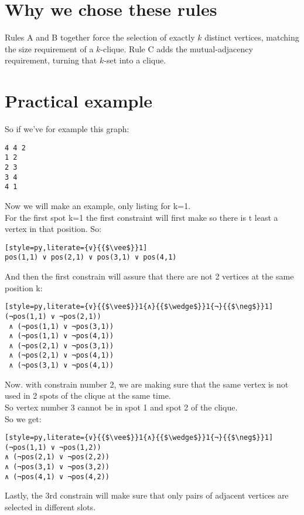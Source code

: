 \documentclass[11pt]{article}
\begin{document}
\section*{Why we chose these rules}
Rules A and B together force the selection of exactly $k$ distinct vertices, matching the size requirement of a $k$-clique.  
Rule C adds the mutual-adjacency requirement, turning that $k$-set into a clique.

\section*{Practical example}

So if we've for example this graph:

\begin{lstlisting}[style=py]
4 4 2
1 2
2 3
3 4
4 1
\end{lstlisting}

Now we will make an example, only listing for k=1. \\
For the first spot k=1 the first constraint will first make so there is t least a vertex in that position.
So:
\begin{lstlisting}[style=py,literate={∨}{{$\vee$}}1]
pos(1,1) ∨ pos(2,1) ∨ pos(3,1) ∨ pos(4,1)
\end{lstlisting}

And then the first constrain will assure that there are not 2 vertices at the same position k:

\begin{lstlisting}[style=py,literate={∨}{{$\vee$}}1{∧}{{$\wedge$}}1{¬}{{$\neg$}}1]
(¬pos(1,1) ∨ ¬pos(2,1))
 ∧ (¬pos(1,1) ∨ ¬pos(3,1))
 ∧ (¬pos(1,1) ∨ ¬pos(4,1))
 ∧ (¬pos(2,1) ∨ ¬pos(3,1))
 ∧ (¬pos(2,1) ∨ ¬pos(4,1))
 ∧ (¬pos(3,1) ∨ ¬pos(4,1))
 \end{lstlisting}


 Now. with constrain number 2, we are making sure that the same vertex is not used in 2 spots of the clique at the same time.\\
 So vertex number 3 cannot be in spot 1 and spot 2 of the clique.\\
 So we get:
 \begin{lstlisting}[style=py,literate={∨}{{$\vee$}}1{∧}{{$\wedge$}}1{¬}{{$\neg$}}1]
(¬pos(1,1) ∨ ¬pos(1,2))
∧ (¬pos(2,1) ∨ ¬pos(2,2))
∧ (¬pos(3,1) ∨ ¬pos(3,2))
∧ (¬pos(4,1) ∨ ¬pos(4,2))
 \end{lstlisting}

 Lastly, the 3rd constrain will make sure that only pairs of adjacent vertices are selected in different slots.
\end{document}
